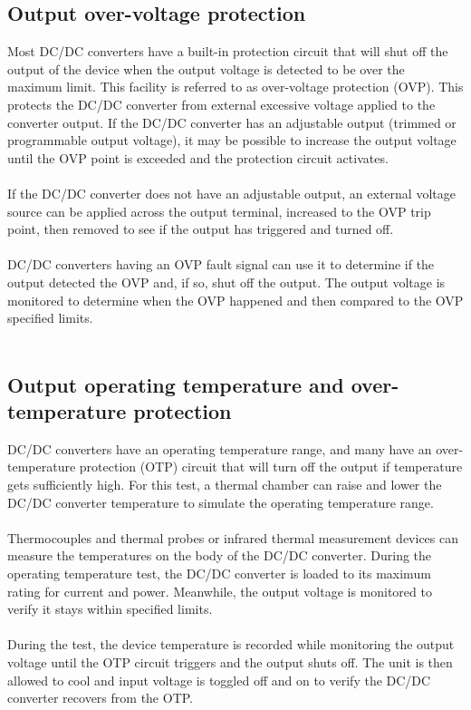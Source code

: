 \subsection{Output over-voltage protection} 

Most DC/DC converters have a built-in protection circuit that will shut off the output of the device when the output voltage is detected to be over the maximum limit. This facility is referred to as over-voltage protection (OVP). This protects the DC/DC converter from external excessive voltage applied to the converter output. If the DC/DC converter has an adjustable output (trimmed or programmable output voltage), it may be possible to increase the output voltage until the OVP point is exceeded and the protection circuit activates.
\\ \\
If the DC/DC converter does not have an adjustable output, an external voltage source can be applied across the output terminal, increased to the OVP trip point, then removed to see if the output has triggered and turned off.
\\ \\
DC/DC converters having an OVP fault signal can use it to determine if the output detected the OVP and, if so, shut off the output. The output voltage is monitored to determine when the OVP happened and then compared to the OVP specified limits.
\\ \\
\subsection{Output operating temperature and over-temperature protection} 

DC/DC converters have an operating temperature range, and many have an over-temperature protection (OTP) circuit that will turn off the output if temperature gets sufficiently high. For this test, a thermal chamber can raise and lower the DC/DC converter temperature to simulate the operating temperature range.
\\ \\
Thermocouples and thermal probes or infrared thermal measurement devices can measure the temperatures on the body of the DC/DC converter. During the operating temperature test, the DC/DC converter is loaded to its maximum rating for current and power. Meanwhile, the output voltage is monitored to verify it stays within specified limits.
\\ \\
During the test, the device temperature is recorded while monitoring the output voltage until the OTP circuit triggers and the output shuts off. The unit is then allowed to cool and input voltage is toggled off and on to verify the DC/DC converter recovers from the OTP.
\\ \\
